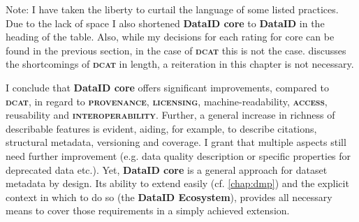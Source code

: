 \documentclass[a4paper,english,twoside,BCOR1.5cm,headsepline,DIV12,appendixprefix,final,12pt]{scrbook}
\newcommand{\provenance}{{\ttfamily\scshape\bfseries provenance}\xspace}
\newcommand{\licensing}{{\ttfamily\scshape\bfseries licensing}\xspace}
\newcommand{\access}{{\ttfamily\scshape\bfseries access}\xspace}
\newcommand{\interoperability}{{\ttfamily\scshape\bfseries interoperability}\xspace}
\newcommand{\ecosystem}{{\ttfamily\bfseries DataID Ecosystem}\xspace}
\newcommand{\dataid}{{\ttfamily\bfseries DataID}\xspace}
\newcommand{\core}{{\ttfamily\bfseries DataID core}\xspace}
\newcommand{\dcat}{{\scshape\bfseries dcat}\xspace}
\begin{document}
Note: I have taken the liberty to curtail the language of some listed practices. Due to the lack of space I also shortened \core to \dataid in the heading of the table. Also, while my decisions for each rating for core can be found in the previous section, in the case of \dcat this is not the case.  discusses the shortcomings of \dcat in length, a reiteration in this chapter is not necessary.

I conclude that \core offers significant improvements, compared to \dcat, in regard to \provenance, \licensing, machine-readability, \access, reusability and \interoperability. Further, a general increase in richness of describable features is evident, aiding, for example, to describe citations, structural metadata, versioning and coverage.
I grant that multiple aspects still need further improvement (e.g. data quality description or specific properties for deprecated data etc.). Yet, \core is a general approach for dataset metadata by design. Its ability to extend easily (cf. \cref{chap:dmp}) and the explicit context in which to do so (the \ecosystem), provides all necessary means to cover those requirements in a simply achieved extension.
\end{document}

